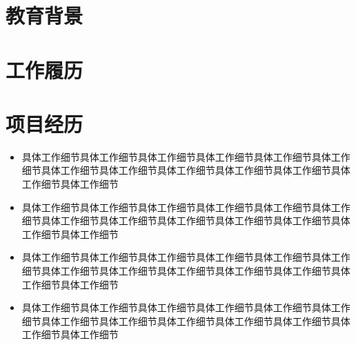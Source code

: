 \documentclass{my_cv} %
\begin{document}



\section{教育背景}
\vspace{-5pt} %
\vspace{-2pt}

\section{工作履历}
\vspace{-5pt}
\vspace{-5pt}
\vspace{-2pt}

\section{项目经历}

\vspace{-5pt}
\begin{itemize}
  \item 具体工作细节具体工作细节具体工作细节具体工作细节具体工作细节具体工作细节具体工作细节具体工作细节具体工作细节具体工作细节具体工作细节具体工作细节具体工作细节
  \item 具体工作细节具体工作细节具体工作细节具体工作细节具体工作细节具体工作细节具体工作细节具体工作细节具体工作细节具体工作细节具体工作细节具体工作细节具体工作细节
  \item 具体工作细节具体工作细节具体工作细节具体工作细节具体工作细节具体工作细节具体工作细节具体工作细节具体工作细节具体工作细节具体工作细节具体工作细节具体工作细节
  \item 具体工作细节具体工作细节具体工作细节具体工作细节具体工作细节具体工作细节具体工作细节具体工作细节具体工作细节具体工作细节具体工作细节具体工作细节具体工作细节
\end{itemize}
\vspace{-10pt}
\end{document}
